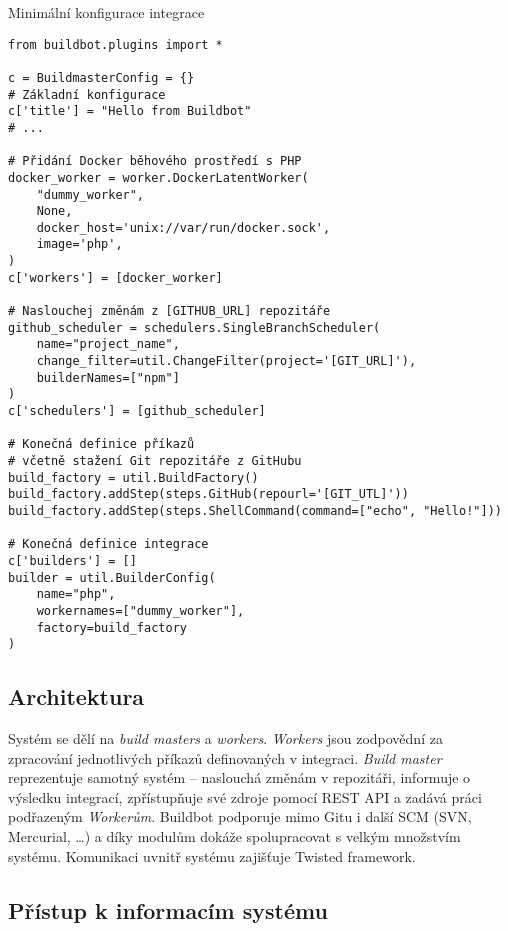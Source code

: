 \begin{listing}[ht]
\caption{\label{code:buildbot-minimal-config}Minimální konfigurace integrace}
\begin{verbatim}
from buildbot.plugins import *

c = BuildmasterConfig = {}
# Základní konfigurace
c['title'] = "Hello from Buildbot"
# ...

# Přidání Docker běhového prostředí s PHP
docker_worker = worker.DockerLatentWorker(
    "dummy_worker",
    None,
    docker_host='unix://var/run/docker.sock',
    image='php',
)
c['workers'] = [docker_worker]

# Naslouchej změnám z [GITHUB_URL] repozitáře
github_scheduler = schedulers.SingleBranchScheduler(
    name="project_name",
    change_filter=util.ChangeFilter(project='[GIT_URL]'),
    builderNames=["npm"]
)
c['schedulers'] = [github_scheduler]

# Konečná definice příkazů
# včetně stažení Git repozitáře z GitHubu
build_factory = util.BuildFactory()
build_factory.addStep(steps.GitHub(repourl='[GIT_UTL]'))
build_factory.addStep(steps.ShellCommand(command=["echo", "Hello!"]))

# Konečná definice integrace
c['builders'] = []
builder = util.BuilderConfig(
    name="php",
    workernames=["dummy_worker"],
    factory=build_factory
)

\end{verbatim}
\end{listing}

\subsection{Architektura}

Systém se dělí na \textit{build masters} a \textit{workers}.
\textit{Workers} jsou zodpovědní za zpracování jednotlivých příkazů definovaných v integraci.
\textit{Build master} reprezentuje samotný systém -- naslouchá změnám v repozitáři, informuje o výsledku integrací, zpřístupňuje své zdroje pomocí REST API a zadává práci podřazeným \textit{Workerům}.
Buildbot podporuje mimo Gitu i další SCM (SVN, Mercurial, \ldots) a díky modulům dokáže spolupracovat s velkým množstvím systému.
Komunikaci uvnitř systému zajišťuje Twisted framework.

\subsection{Přístup k informacím systému}

